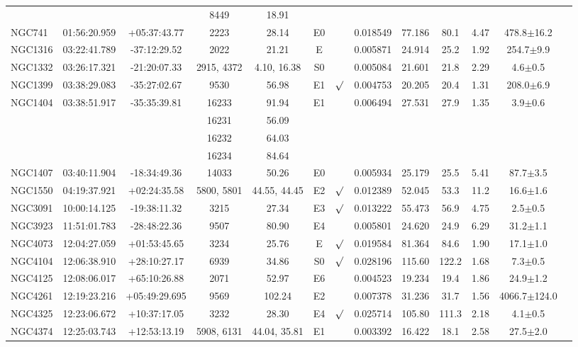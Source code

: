 \documentclass[iop]{emulateapj}
\begin{document}
\begin{table}
\begin{tabular}{lcccccccccccc}
        & && 8449 & 18.91 & \\
NGC741  & 01:56:20.959 & +05:37:43.77 & 2223 & 28.14 & E0 &         & 0.018549 & 77.186 & 80.1 & 4.47 & 478.8$\pm$16.2 \\
NGC1316 & 03:22:41.789 & -37:12:29.52 & 2022  & 21.21  & E &         & 0.005871 & 24.914 & 25.2  & 1.92 & 254.7$\pm$9.9\\
NGC1332 & 03:26:17.321 & -21:20:07.33 & 2915, 4372  & 4.10, 16.38  & S0  &         & 0.005084 & 21.601 & 21.8  & 2.29 & 4.6$\pm$0.5 \\
NGC1399 & 03:38:29.083 & -35:27:02.67 & 9530  & 56.98    & E1   & $\surd$ & 0.004753 & 20.205 & 20.4  &  1.31 & 208.0$\pm$6.9\\
NGC1404 & 03:38:51.917 & -35:35:39.81 & 16233 & 91.94  & E1  & & 0.006494 & 27.531 & 27.9  & 1.35 & 3.9$\pm$0.6 \\
        & && 16231 & 56.09 &\\
        & && 16232 & 64.03 &\\
        & && 16234 & 84.64 &\\
NGC1407 & 03:40:11.904 & -18:34:49.36 & 14033 & 50.26    & E0   &         & 0.005934 & 25.179 & 25.5  &  5.41 & 87.7$\pm$3.5 \\
NGC1550 & 04:19:37.921 & +02:24:35.58 & 5800, 5801 & 44.55, 44.45 & E2   & $\surd$ & 0.012389 & 52.045 & 53.3 & 11.2  & 16.6$\pm$1.6 \\
NGC3091 & 10:00:14.125 & -19:38:11.32 & 3215 & 27.34 & E3 & $\surd$ & 0.013222 & 55.473 & 56.9 & 4.75 & 2.5$\pm$0.5 \\
NGC3923 & 11:51:01.783 & -28:48:22.36  & 9507  & 80.90  & E4  &         & 0.005801 & 24.620 & 24.9 & 6.29 & 31.2$\pm$1.1 \\
NGC4073 & 12:04:27.059 & +01:53:45.65 & 3234 & 25.76 & E  & $\surd$ & 0.019584 & 81.364 & 84.6 & 1.90 & 17.1$\pm$1.0 \\
NGC4104 & 12:06:38.910 & +28:10:27.17 &  6939 & 34.86    & S0  & $\surd$ & 0.028196 & 115.60  & 122.2 &  1.68 & 7.3$\pm$0.5 \\
NGC4125 & 12:08:06.017 & +65:10:26.88  & 2071   & 52.97 & E6  &         & 0.004523 & 19.234 & 19.4 & 1.86 & 24.9$\pm$1.2 \\
NGC4261 & 12:19:23.216 & +05:49:29.695 &  9569 & 102.24   & E2 &         & 0.007378 & 31.236 & 31.7  &  1.56 & 4066.7$\pm$124.0 \\
NGC4325 & 12:23:06.672 & +10:37:17.05 & 3232 & 28.30 & E4 & $\surd$ & 0.025714 & 105.80 & 111.3 & 2.18 & 4.1$\pm$0.5 \\
NGC4374 & 12:25:03.743 & +12:53:13.19  & 5908, 6131 & 44.04, 35.81  & E1 &           & 0.003392 & 16.422 & 18.1 & 2.58 & 27.5$\pm$2.0 \\

\end{tabular}
\end{table}
\end{document}
